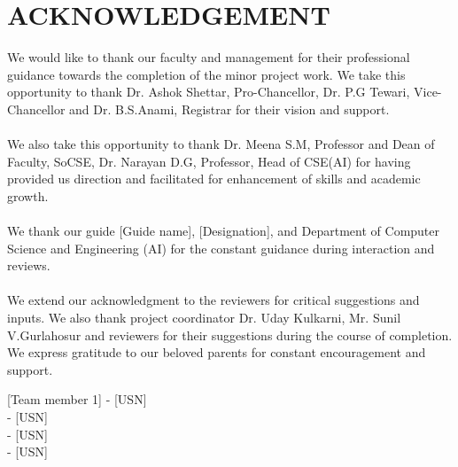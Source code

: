 \chapter*{ACKNOWLEDGEMENT}


\begin{justify}
    


We would like to thank our faculty and management for their professional guidance towards
the completion of the minor project work. We take this opportunity to thank Dr. Ashok
Shettar, Pro-Chancellor, Dr. P.G Tewari, Vice-Chancellor and Dr. B.S.Anami, Registrar for
their vision and support. \\ \\
We also take this opportunity to thank Dr. Meena S.M, Professor and Dean of Faculty, SoCSE, Dr. Narayan D.G, Professor, Head of CSE(AI) for having provided us direction and
facilitated for enhancement of skills and academic growth. \\ \\
We thank our guide [Guide name], [Designation], and Department of Computer Science and Engineering (AI) for the constant
guidance during interaction and reviews. \\ \\
We extend our acknowledgment to the reviewers for critical suggestions and inputs. We also
thank project coordinator Dr. Uday Kulkarni, Mr. Sunil V.Gurlahosur and reviewers for their suggestions during the
course of completion. We express gratitude to our beloved parents for constant encouragement
and support. 

\end{justify}

\begin{flushright}
\vspace{3cm}

{[Team member 1]} - [USN]\\
\indent\indent\indent\indent\indent\indent\indent\indent\indent\indent\indent\indent\indent\indent\indent\indent\indent\indent{} - [USN]\\
\indent\indent\indent\indent\indent\indent\indent\indent\indent\indent\indent\indent\indent\indent\indent\indent\indent\indent{} - [USN]\\
\indent\indent\indent\indent\indent\indent\indent\indent\indent\indent\indent\indent\indent\indent\indent\indent\indent\indent{} - [USN]\\
 
 
\end{flushright}

